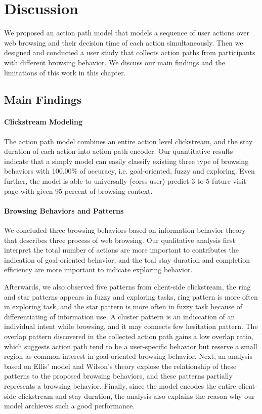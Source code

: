 \section{Discussion}
\label{ch:discuss}

We proposed an action path model that models a sequence of user actions over web browsing
and their decision time of each action simultaneously.
Then we designed and conducted a user study that collects action paths
from participants with different browsing behavior.
We discuss our main findings and the limitations of this work in this chapter.

\subsection{Main Findings}

\paragraph{Clickstream Modeling}

The action path model combines an entire action level clickstream, 
and the stay duration of each action into action path encoder.
Our quantitative results indicate that 
a simply model can easily classify existing three type of browsing
behaviors with 100.00\% of accuracy, i.e. goal-oriented, fuzzy and exploring.
Even further, the model is able to universally (corss-user) predict 3 to 5 future visit 
page with given 95 percent of browsing context.

\paragraph{Browsing Behaviors and Patterns}

We concluded three browsing behaviors based on information behavior theory that describes
three process of web browsing.
Our qualitative analysis 
first interpret the total number of actions 
are more important to contributes the indication of goal-oriented behavior,
and the toal stay duration and completion efficiency are more important to indicate exploring behavior.

Afterwards, we also observed five patterns from client-side clickstream, the ring and star patterns
appears in fuzzy and exploring tasks, ring pattern is more often in exploring task,
and the star pattern is more often in fuzzy task because of differentiating of information use.
A cluster pattern is an indiccation of an individual intent while browsing, and it may connects
few hesitation pattern.
The overlap pattern discovered in the collected action path gains a low overlap ratio,
which suggests action path tend to be a user-specific behavior but reserve a small region as
common interest in goal-oriented browsing behavior.
Next, an analysis based on Ellis' model and Wilson's theory explose the relationship 
of these patterns to the proposed browsing behaviors, and these patterns partially represents a browsing behavior.
Finally, since the model encodes the entire client-side clickstream and stay duration,
the analysis also explains the reason why our model archieves such a good performance.

